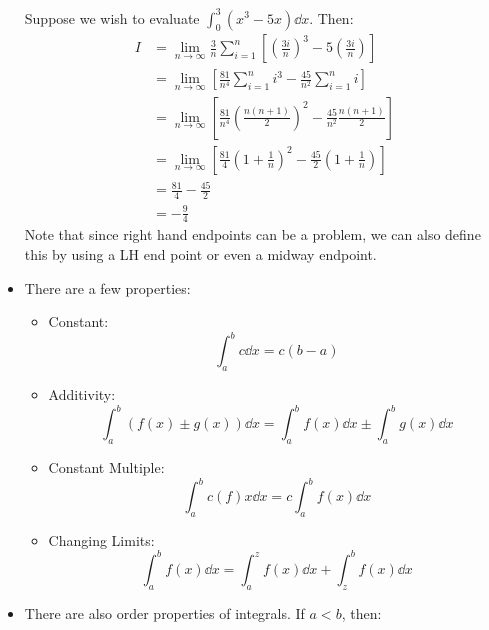 \begin{itemize}
\begin{equation}
    \end{equation}
    \begin{example}
        Suppose we wish to evaluate $\int_0^3 (x^3-5x) \dd{x}$. Then:
        \begin{align}
            I &= \lim_{n\to\infty} \frac{3}{n} \sum_{i=1}^n \left[\left(\frac{3i}{n}\right)^3-5\left(\frac{3i}{n}\right)\right] \\ 
            &= \lim_{n\to \infty} \left[\frac{81}{n^4}\sum_{i=1}^n i^3 - \frac{45}{n^2}\sum_{i=1}^n i\right] \\ 
            &= \lim_{n\to \infty}\left[\frac{81}{n^4}\left(\frac{n(n+1)}{2}\right)^2-\frac{45}{n^2}\frac{n(n+1)}{2}\right] \\ 
            &= \lim_{n\to\infty} \left[\frac{81}{4}\left(1+\frac{1}{n}\right)^2-\frac{45}{2}\left(1+\frac{1}{n}\right)\right] \\ 
            &= \frac{81}{4}-\frac{45}{2} \\ 
            &= -\frac{9}{4}
        \end{align}
        Note that since right hand endpoints can be a problem, we can also define this by using a LH end point or even a midway endpoint.
    \end{example}
    \item There are a few properties:
\begin{itemize}
    \item Constant:    \begin{equation}
        \int_a^b c\dd{x} = c(b-a)
        \label{eq:}
    \end{equation}
    \item Additivity: \begin{equation}
        \int_a^b \left(f(x) \pm g(x)\right) \dd{x} = \int_a^b f(x)\dd{x} \pm \int_a^b g(x)\dd{x}
    \end{equation}
    \item Constant Multiple:
    \begin{equation}
        \int_a^b c(f)x \dd{x} = c\int_a^b f(x)\dd{x}
    \end{equation}
    \item Changing Limits:
    \begin{equation}
        \int_a^b f(x) \dd{x} = \int_a^zf(x)\dd{x} + \int_z^bf(x)\dd{x}
    \end{equation}
\end{itemize}
\item There are also order properties of integrals. If $a<b$, then:
\begin{itemize}

\end{itemize}
\end{itemize}
